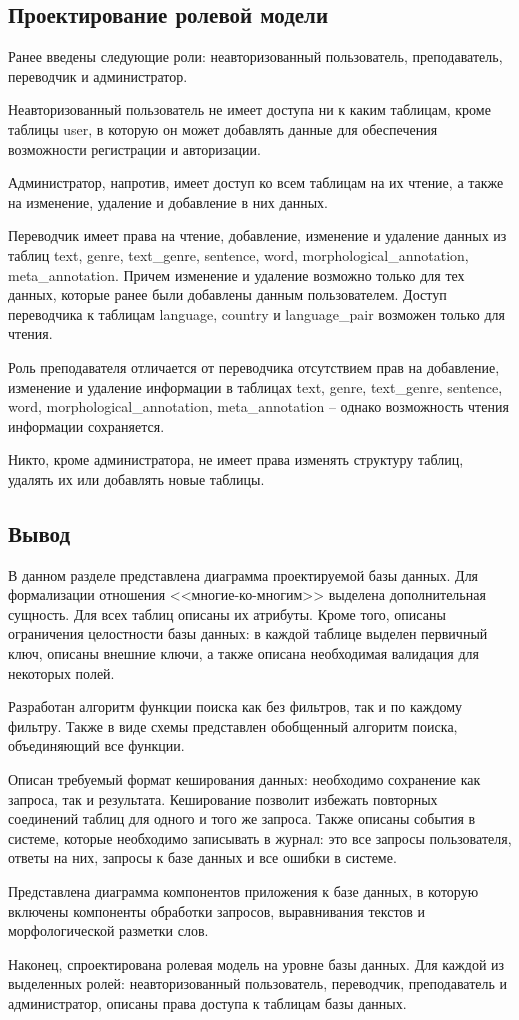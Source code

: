 \subsection{Проектирование ролевой модели}

Ранее введены следующие роли: неавторизованный пользователь, преподаватель, переводчик и администратор.

Неавторизованный пользователь не имеет доступа ни к каким таблицам, кроме таблицы user, в которую он может добавлять данные для обеспечения возможности регистрации и авторизации.

Администратор, напротив, имеет доступ ко всем таблицам на их чтение, а также на изменение, удаление и добавление в них данных.

Переводчик имеет права на чтение, добавление, изменение и удаление данных из таблиц text, genre, text\_genre, sentence, word, morphological\_annotation, meta\_annotation. 
Причем изменение и удаление возможно только для тех данных, которые ранее были добавлены данным пользователем. Доступ переводчика к таблицам language, country и language\_pair возможен только для чтения.

Роль преподавателя отличается от переводчика отсутствием прав на добавление, изменение и удаление информации в таблицах text, genre, text\_genre, sentence, word, morphological\_annotation, meta\_annotation -- однако возможность чтения информации сохраняется.

Никто, кроме администратора, не имеет права изменять структуру таблиц, удалять их или добавлять новые таблицы.

\subsection*{Вывод}

В данном разделе представлена диаграмма проектируемой базы данных. 
Для формализации отношения <<многие-ко-многим>> выделена дополнительная сущность. Для всех таблиц описаны их атрибуты. 
Кроме того, описаны ограничения целостности базы данных: в каждой таблице выделен первичный ключ, описаны внешние ключи, а также описана необходимая валидация для некоторых полей.

Разработан алгоритм функции поиска как без фильтров, так и по каждому фильтру. Также в виде схемы представлен обобщенный алгоритм поиска, объединяющий все функции.

Описан требуемый формат кеширования данных: необходимо сохранение как запроса, так и результата. Кеширование позволит избежать повторных соединений таблиц для одного и того же запроса. Также описаны события в системе, которые необходимо записывать в журнал: это все запросы пользователя, ответы на них, запросы к базе данных и все ошибки в системе.

Представлена диаграмма компонентов приложения к базе данных, в которую включены компоненты обработки запросов, выравнивания текстов и морфологической разметки слов.

Наконец, спроектирована ролевая модель на уровне базы данных. 
Для каждой из выделенных ролей: неавторизованный пользователь, переводчик, преподаватель и администратор, описаны права доступа к таблицам базы данных.



\pagebreak